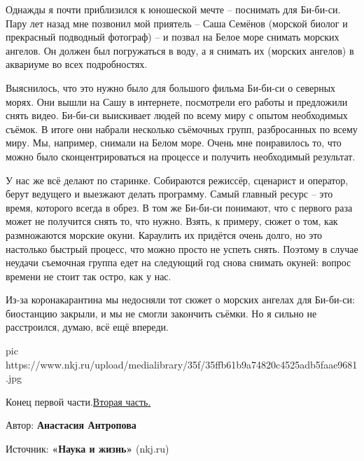 Однажды я почти приблизился к юношеской мечте – поснимать для Би-би-си. Пару
лет назад мне позвонил мой приятель – Саша Семёнов (морской биолог и прекрасный
подводный фотограф) – и позвал на Белое море снимать морских ангелов. Он должен
был погружаться в воду, а я снимать их (морских ангелов) в аквариуме во всех
подробностях.

Выяснилось, что это нужно было для большого фильма Би-би-си о северных морях.
Они вышли на Сашу в интернете, посмотрели его работы и предложили снять видео.
Би-би-си выискивает людей по всему миру с опытом необходимых съёмок. В итоге
они набрали несколько съёмочных групп, разбросанных по всему миру. Мы,
например, снимали на Белом море. Очень мне понравилось то, что можно было
сконцентрироваться на процессе и получить необходимый результат.

У нас же всё делают по старинке. Собираются режиссёр, сценарист и оператор,
берут ведущего и выезжают делать программу. Самый главный ресурс – это время,
которого всегда в обрез. В том же Би-би-си понимают, что с первого раза может
не получится снять то, что нужно. Взять, к примеру, сюжет о том, как
размножаются морские окуни. Караулить их придётся очень долго, но это настолько
быстрый процесс, что можно просто не успеть снять. Поэтому в случае неудачи
съемочная группа едет на следующий год снова снимать окуней: вопрос времени не
стоит так остро, как у нас.

Из-за коронакарантина мы недосняли тот сюжет о морских ангелах для Би-би-си:
биостанцию закрыли, и мы не смогли закончить съёмки. Но я сильно не
расстроился, думаю, всё ещё впереди. 

\ifcmt
pic https://www.nkj.ru/upload/medialibrary/35f/35ffb61b9a74820c4525adb5faae9681.jpg
\fi

Конец первой части.\href{https://www.nkj.ru/open/39690/}{Вторая часть.}

Автор: \textbf{Анастасия Антропова}

Источник: \textbf{«Наука и жизнь»} (nkj.ru) 
